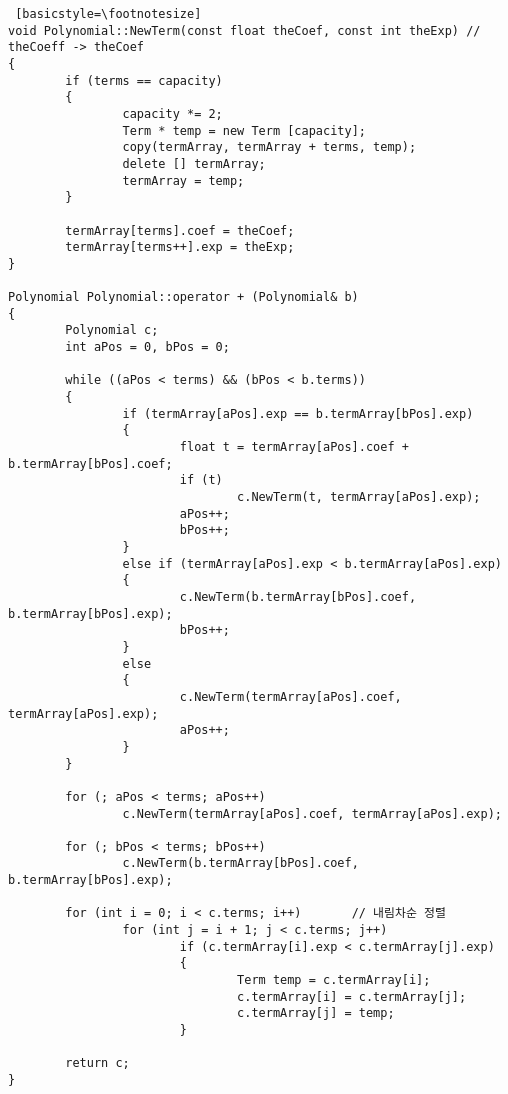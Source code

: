 \documentclass[twoside,twocolumn]{article}
\begin{document}
\begin{lstlisting} [basicstyle=\footnotesize]
void Polynomial::NewTerm(const float theCoef, const int theExp) // theCoeff -> theCoef
{
        if (terms == capacity)
        {
                capacity *= 2;
                Term * temp = new Term [capacity];
                copy(termArray, termArray + terms, temp);
                delete [] termArray;
                termArray = temp;
        }

        termArray[terms].coef = theCoef;
        termArray[terms++].exp = theExp;
}

Polynomial Polynomial::operator + (Polynomial& b)
{
        Polynomial c;
        int aPos = 0, bPos = 0;

        while ((aPos < terms) && (bPos < b.terms))
        {
                if (termArray[aPos].exp == b.termArray[bPos].exp)
                {
                        float t = termArray[aPos].coef + b.termArray[bPos].coef;
                        if (t)
                                c.NewTerm(t, termArray[aPos].exp);
                        aPos++;
                        bPos++;
                }
                else if (termArray[aPos].exp < b.termArray[aPos].exp)
                {
                        c.NewTerm(b.termArray[bPos].coef, b.termArray[bPos].exp);
                        bPos++;
                }
                else
                {
                        c.NewTerm(termArray[aPos].coef, termArray[aPos].exp);
                        aPos++;
                }
        }

        for (; aPos < terms; aPos++)
                c.NewTerm(termArray[aPos].coef, termArray[aPos].exp);

        for (; bPos < terms; bPos++)
                c.NewTerm(b.termArray[bPos].coef, b.termArray[bPos].exp);

        for (int i = 0; i < c.terms; i++)       // 내림차순 정렬
                for (int j = i + 1; j < c.terms; j++)
                        if (c.termArray[i].exp < c.termArray[j].exp)
                        {
                                Term temp = c.termArray[i];
                                c.termArray[i] = c.termArray[j];
                                c.termArray[j] = temp;
                        }

        return c;
}
\end{lstlisting}
\end{document}
